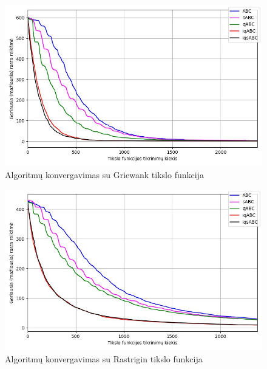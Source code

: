\documentclass{VUMIFKompMagistrinis}
\begin{document}
\begin{landscape}
\begin{multicols}{2}
\begin{figure}[H]
    \centering
    \includegraphics[scale=0.45]{img/2kv/all_griewank.jpg}
     \caption{Algoritmų konvergavimas su Griewank tikslo funkcija}
    \label{img:kon5a}
\end{figure}

\begin{figure}[H]
    \centering
    \includegraphics[scale=0.45]{img/2kv/all_rastrigin.jpg}
     \caption{Algoritmų konvergavimas su Rastrigin tikslo funkcija}
    \label{img:kon5}
\end{figure}



\end{multicols}
\begin{multicols}{2}


\end{multicols}
\end{landscape}
\end{document}
